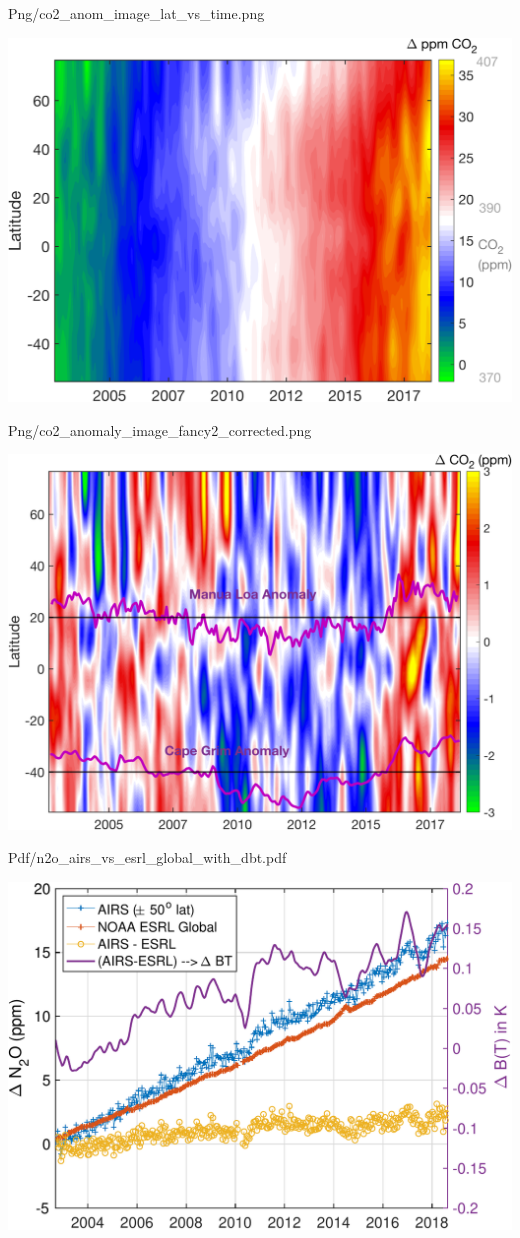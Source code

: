 \documentclass[presentation]{beamer}
\begin{document}
\begin{frame}[label={sec:org45977e6}]{Png/co2\_anom\_image\_lat\_vs\_time.png}
\begin{center}
\includegraphics[width=0.7\linewidth]{./Figs/Png/co2_anom_image_lat_vs_time.png}
\end{center}
\end{frame}

\begin{frame}[label={sec:org36e3c4c}]{Png/co2\_anomaly\_image\_fancy2\_corrected.png}
\begin{center}
\includegraphics[width=0.7\linewidth]{./Figs/Png/co2_anomaly_image_fancy2_corrected.png}
\end{center}
\end{frame}

\begin{frame}[label={sec:orgff0893c}]{Pdf/n2o\_airs\_vs\_esrl\_global\_with\_dbt.pdf}
\begin{center}
\includegraphics[width=0.7\linewidth]{./Figs/Pdf/n2o_airs_vs_esrl_global_with_dbt.pdf}
\end{center}
\end{frame}
\end{document}

